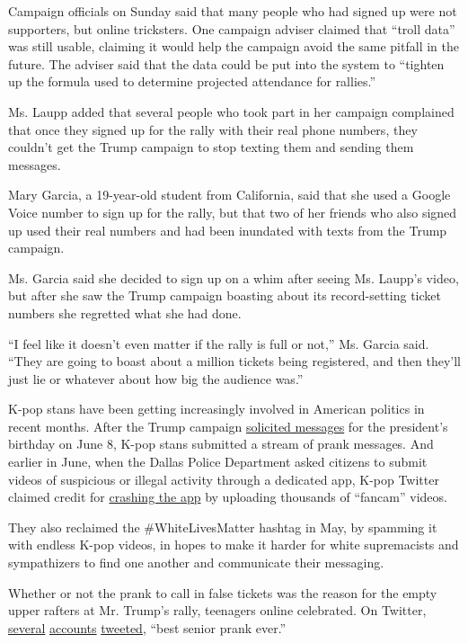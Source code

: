 Campaign officials on Sunday said that many people who had signed up
were not supporters, but online tricksters. One campaign adviser claimed
that ``troll data'' was still usable, claiming it would help the
campaign avoid the same pitfall in the future. The adviser said that the
data could be put into the system to ``tighten up the formula used to
determine projected attendance for rallies.''

Ms. Laupp added that several people who took part in her campaign
complained that once they signed up for the rally with their real phone
numbers, they couldn't get the Trump campaign to stop texting them and
sending them messages.

Mary Garcia, a 19-year-old student from California, said that she used a
Google Voice number to sign up for the rally, but that two of her
friends who also signed up used their real numbers and had been
inundated with texts from the Trump campaign.

Ms. Garcia said she decided to sign up on a whim after seeing Ms.
Laupp's video, but after she saw the Trump campaign boasting about its
record-setting ticket numbers she regretted what she had done.

``I feel like it doesn't even matter if the rally is full or not,'' Ms.
Garcia said. ``They are going to boast about a million tickets being
registered, and then they'll just lie or whatever about how big the
audience was.''

K-pop stans have been getting increasingly involved in American politics
in recent months. After the Trump campaign
\href{https://twitter.com/TeamTrump/status/1270127968736677888}{solicited
messages} for the president's birthday on June 8, K-pop stans submitted
a stream of prank messages. And earlier in June, when the Dallas Police
Department asked citizens to submit videos of suspicious or illegal
activity through a dedicated app, K-pop Twitter claimed credit for
\href{https://melmagazine.com/en-us/story/what-we-can-learn-from-k-pop-stans-about-fighting-fascism}{crashing
the app} by uploading thousands of ``fancam'' videos.

They also reclaimed the \#WhiteLivesMatter hashtag in May, by spamming
it with endless K-pop videos, in hopes to make it harder for white
supremacists and sympathizers to find one another and communicate their
messaging.

Whether or not the prank to call in false tickets was the reason for the
empty upper rafters at Mr. Trump's rally, teenagers online celebrated.
On Twitter,
\href{https://twitter.com/sophiadelsol/status/1274145891490959360?s=20}{several}
\href{https://twitter.com/cbjeffreys/status/1274514747241750529?s=20}{accounts}
\href{https://twitter.com/s87788255/status/1274536326528856064?s=20}{tweeted},
``best senior prank ever.''

